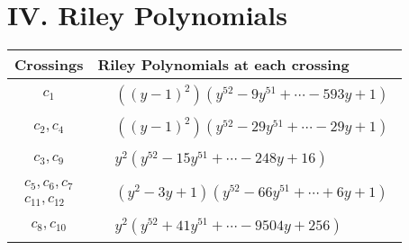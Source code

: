 \documentclass[1p]{elsarticle_modified}
\theoremstyle{definition}
\begin{document}
\centering \section*{ IV. Riley Polynomials}
\begin{tabular}{m{50pt}|m{274pt}}
Crossings & \hspace{64pt}Riley Polynomials at each crossing \\
\hline $$\begin{aligned}c_{1}\end{aligned}$$&$\begin{aligned}
&((y-1)^2)(y^{52}-9 y^{51}+\cdots-593 y+1)
\end{aligned}$\\
\hline $$\begin{aligned}c_{2},c_{4}\end{aligned}$$&$\begin{aligned}
&((y-1)^2)(y^{52}-29 y^{51}+\cdots-29 y+1)
\end{aligned}$\\
\hline $$\begin{aligned}c_{3},c_{9}\end{aligned}$$&$\begin{aligned}
&y^2(y^{52}-15 y^{51}+\cdots-248 y+16)
\end{aligned}$\\
\hline $$\begin{aligned}c_{5},c_{6},c_{7}\\c_{11},c_{12}\end{aligned}$$&$\begin{aligned}
&(y^2-3 y+1)(y^{52}-66 y^{51}+\cdots+6 y+1)
\end{aligned}$\\
\hline $$\begin{aligned}c_{8},c_{10}\end{aligned}$$&$\begin{aligned}
&y^2(y^{52}+41 y^{51}+\cdots-9504 y+256)
\end{aligned}$\\
\hline
\end{tabular}
\vskip 2pc
\end{document}
